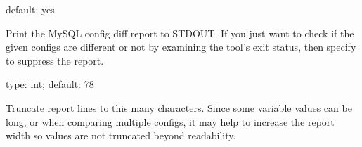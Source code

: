 \documentclass[letterpaper,10pt,english]{sphinxmanual}
\begin{document}
\begin{fulllineitems}
\label{\detokenize{mariadb-config-diff:cmdoption-mariadb-config-diff-no-report}}
default: yes

Print the MySQL config diff report to STDOUT.  If you just want to check
if the given configs are different or not by examining the tool’s exit
status, then specify  to suppress the report.

\end{fulllineitems}


\begin{fulllineitems}
\label{\detokenize{mariadb-config-diff:cmdoption-mariadb-config-diff-report-width}}
type: int; default: 78

Truncate report lines to this many characters.  Since some variable values can
be long, or when comparing multiple configs, it may help to increase the
report width so values are not truncated beyond readability.

\end{fulllineitems}

\end{document}
